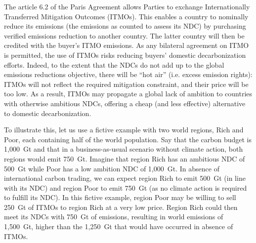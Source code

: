\documentclass[12pt,english]{article}
\begin{document}
The article 6.2 of the Paris Agreement allows Parties to exchange Internationally Transferred Mitigation Outcomes (ITMOs). This enables a country to nominally reduce its emissions (the emissions as counted to assess its NDC) by purchasing verified emissions reduction to another country. The latter country will then be credited with the buyer's ITMO emissions. As any bilateral agreement on ITMO is permitted, the use of ITMOs risks reducing buyers' domestic decarbonization efforts. %
Indeed, to the extent that the NDCs do not add up to the global emissions reductions objective, there will be ``hot air'' (i.e. excess emission rights): ITMOs will not reflect the required mitigation constraint, and their price will be too low. As a result, ITMOs may propagate a global lack of ambition to countries with otherwise ambitious NDCs, offering a cheap (and less effective) alternative to domestic decarbonization. 

To illustrate this, let us use a fictive example with two world regions, Rich and Poor, each containing half of the world population. Say that the carbon budget is 1,000~Gt and that in a business-as-usual scenario without climate action, both regions would emit 750~Gt. Imagine that region Rich has an ambitious NDC of 500~Gt while Poor has a low ambition NDC of 1,000~Gt. In absence of international carbon trading, we can expect region Rich to emit 500~Gt (in line with its NDC) and region Poor to emit 750~Gt (as no climate action is required to fulfill its NDC). In this fictive example, region Poor may be willing to sell 250~Gt of ITMOs to region Rich at a very low price. Region Rich could then meet its NDCs with 750~Gt of emissions, resulting in world emissions of 1,500~Gt, higher than the 1,250~Gt that would have occurred in absence of ITMOs.
\end{document}
